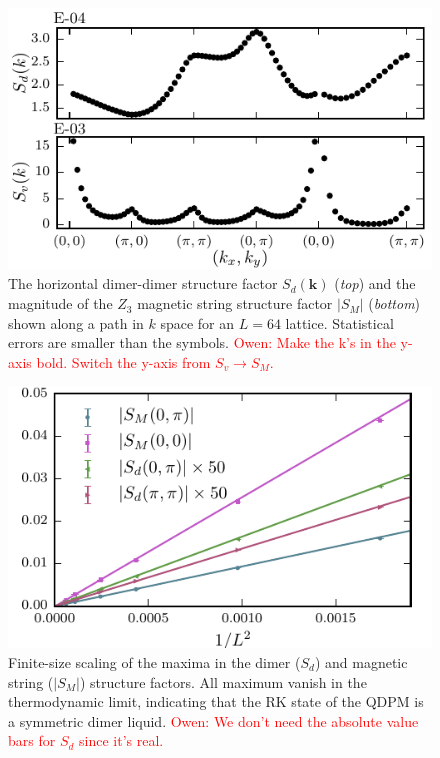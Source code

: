 \documentclass[twocolumn,prb,aps,floatfix,superscriptaddress]{revtex4-1}
\newcommand{\note}[1]{\textcolor{red}{#1}}
\begin{document}
    \begin{figure}[t]
        \centering
        \includegraphics[width=1.0\columnwidth]{vis_dmr_qdpm_struc_fac_32x32.pdf}
        \caption{ The horizontal dimer-dimer structure factor $S_d(\bm{k})$ ({\it top}) and the magnitude of the $Z_3$ magnetic string structure factor $|S_M|$ ({\it bottom})
        shown along a path in $k$ space for an $L=64$ lattice. Statistical errors are smaller than the symbols. \note{Owen: Make the k's in the y-axis bold. Switch the y-axis from $S_v\rightarrow S_M$.}}
        \label{fig:structure_factor_path}
    \end{figure}
\begin{figure}[t]
    \centering
    \includegraphics[width=1.0\columnwidth]{peak_scaling.pdf}
    \caption{Finite-size scaling of the maxima in the dimer ($S_d$) and magnetic string ($|S_M|$) structure factors. All maximum vanish in the thermodynamic limit, indicating that the RK state of the QDPM is a symmetric dimer liquid. \note{Owen: We don't need the absolute value bars for $S_d$ since it's real.}}
    \label{fig:bragg_scaling}
\end{figure}
\end{document}
